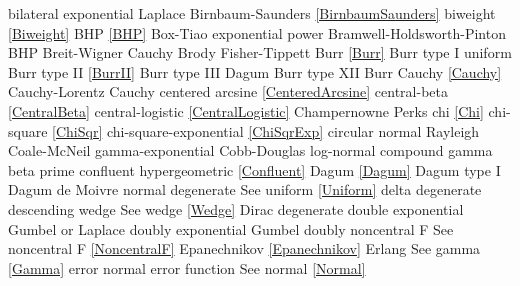 bilateral exponential  			\dotfill	Laplace 							\ncite	%
Birnbaum-Saunders				\dotfill	\eqref{BirnbaumSaunders}			\ncite
biweight						\dotfill	\eqref{Biweight}					\ncite
BHP								\dotfill	\eqref{BHP}							\ncite	%
Box-Tiao						\dotfill	exponential power					\ncite
Bramwell-Holdsworth-Pinton 		\dotfill	BHP 								\ncite	%
Breit-Wigner  					\dotfill	Cauchy 								\ncite	%
Brody							\dotfill	Fisher-Tippett						\ncite	%
Burr							\dotfill	\eqref{Burr} 						\ncite	%
Burr type I						\dotfill	uniform 							\ncite	%
Burr type II					\dotfill	\eqref{BurrII} 						\ncite	%
Burr type III					\dotfill	Dagum								\ncite	%
Burr type XII					\dotfill	Burr 								\ncite	%
%
Cauchy	 						\dotfill	\eqref{Cauchy} 							%
Cauchy-Lorentz 					\dotfill	Cauchy 								\ncite	%
centered arcsine 				\dotfill	\eqref{CenteredArcsine} 			\ncite	%
central-beta 					\dotfill	\eqref{CentralBeta}					\mcite{\self}
central-logistic 				\dotfill	\eqref{CentralLogistic}				\mcite{\self}
Champernowne					\dotfill	Perks								\ncite
chi								\dotfill	\eqref{Chi}							\ncite	%
chi-square						\dotfill	\eqref{ChiSqr}						\ncite	%
chi-square-exponential			\dotfill	\eqref{ChiSqrExp}					\mcite{\self}	%
circular normal					\dotfill	Rayleigh							\ncite %
Coale-McNeil 					\dotfill	gamma-exponential 					     %
Cobb-Douglas					\dotfill	log-normal 							\ncite	%
compound gamma					\dotfill	beta prime								%
confluent hypergeometric 		\dotfill	\eqref{Confluent}					\ncite
%
Dagum 							\dotfill	\eqref{Dagum} 						\ncite	%
Dagum type I 					\dotfill	Dagum								\ncite	%
de Moivre						\dotfill	normal 								\ncite	%
degenerate						\dotfill	See uniform \eqref{Uniform} 		\ncite	%
delta  							\dotfill	degenerate  						\ncite 	%
descending wedge				\dotfill	See wedge \eqref{Wedge} 			\ncite	%
Dirac							\dotfill	degenerate							\ncite	
double exponential 				\dotfill	Gumbel or Laplace 					\ncite	%
doubly exponential				\dotfill	Gumbel								\ncite	%
doubly noncentral F       		\dotfill	See noncentral F  					\eqref{NoncentralF} 	\ncite 
%
Epanechnikov					\dotfill	\eqref{Epanechnikov}				\ncite
Erlang							\dotfill	See gamma \eqref{Gamma} 			\ncite 	%
error 							\dotfill	normal 								\ncite	%
error function					\dotfill	See normal \eqref{Normal}			\ncite	%
